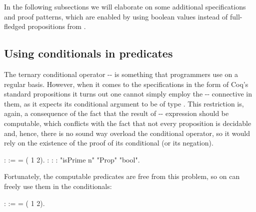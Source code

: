 In the following subsections we will elaborate on some additional
specifications and proof patterns, which are enabled by using boolean
values instead of full-fledged propositions from .


\subsection{Using conditionals in predicates}




The ternary conditional operator -- is something that
programmers use on a regular basis. However, when it comes to the
specifications in the form of Coq's standard propositions it turns out
one cannot simply employ the -- connective in them, as it
expects its conditional argument to be of type . This
restriction is, again, a consequence of the fact that the result of
-- expression should be computable, which conflicts with
the fact that not every proposition is decidable and, hence, there is
no sound way overload the conditional operator, so it would rely on
the existence of the proof of its conditional (or its negation).


\coqdoceol
\coqdocemptyline
\coqdocnoindent
{}    :  :=  = (    1  2).\coqdoceol
\coqdocnoindent
\coqdoceol
\coqdocnoindent
{}:  \coqdoceol
\coqdocnoindent
{} : \coqdoceol
\coqdocnoindent
{} : \coqdoceol
\coqdocnoindent
{}  "isPrime n"   "Prop"        "bool".

\coqdocemptyline


Fortunately, the computable predicates are free from this problem, so
on can freely use them in the conditionals:


\begin{coqdoccode}
\coqdocemptyline
\coqdocnoindent
{}    :  :=  = (    1  2).\coqdoceol
\coqdocemptyline
\end{coqdoccode}


